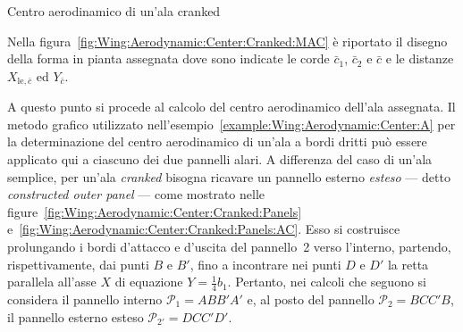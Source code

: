 \documentclass[[12pt,twoside]{book}
\begin{document}
\begin{myExampleX}{Centro aerodinamico di un'ala cranked}{\ \myIconGraph\ }

Nella figura~\ref{fig:Wing:Aerodynamic:Center:Cranked:MAC}
è riportato il disegno della forma in pianta assegnata dove sono indicate le corde $\bar{c}_1$, $\bar{c}_2$ e $\bar{c}$
e le distanze $X_{\mathrm{le},\bar{c}}$ ed $Y_{\bar{c}}$.

\medskip
A questo punto si procede al calcolo del centro aerodinamico dell'ala assegnata.
Il metodo grafico utilizzato nell'esempio~\ref{example:Wing:Aerodynamic:Center:A}
per la determinazione del centro aerodinamico di un'ala a bordi dritti
può essere applicato qui a ciascuno dei due pannelli alari.
A differenza del caso di un'ala semplice, per un'ala \emph{cranked} bisogna ricavare 
un pannello 
esterno \emph{esteso} --- detto \emph{constructed outer panel} --- come mostrato nelle 
figure~\ref{fig:Wing:Aerodynamic:Center:Cranked:Panels}
e~\ref{fig:Wing:Aerodynamic:Center:Cranked:Panels:AC}. 
Esso si costruisce prolungando i bordi d'attacco
e d'uscita del pannello~2 verso l'interno,
partendo, rispettivamente, dai punti $B$ e $B'$, fino a incontrare nei punti $D$ e $D'$ la retta parallela 
all'asse $X$ di equazione $Y=\frac{1}{4}b_1$.
Pertanto, nei calcoli che seguono si considera il pannello interno
$\mathcal{P}_1=ABB'A'$ e,
al posto del pannello $\mathcal{P}_2=BCC'B$,
il pannello esterno esteso $\mathcal{P}_{2'}=DCC'D'$.


\end{myExampleX}
\end{document}
